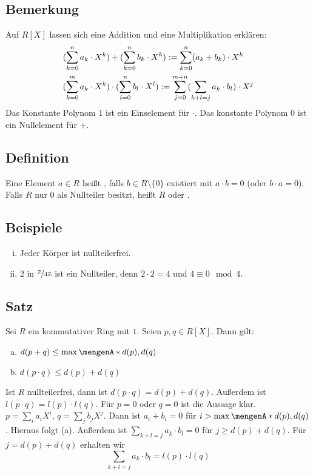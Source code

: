 \subsection[Bemerkung: Addition und Multiplikation auf {$R[X]$}]{Bemerkung} %
\label{sub:54}
Auf $R[X]$ lassen sich eine Addition und eine Multiplikation erklären:
\begin{align*}
	&\enbrace{\sum_{k=0}^{n} a_k \cdot X^k} + \enbrace{\sum_{k=0}^{n} b_k \cdot X^k} := \sum_{k=0}^{n} (a_k + b_k) \cdot X^k  \\
	& \enbrace{\sum_{k=0}^{m} a_k \cdot X^k} \cdot \enbrace{\sum_{l=0}^{n} b_l \cdot X^l} :=  \sum_{j=0}^{m+n} \enbrace{\sum_{k+l=j} a_k \cdot b_l } \cdot X^j 
\end{align*}
Das Konstante Polynom $1$ ist ein Einselement für $\cdot $. Das konstante Polynom $0$ ist ein Nullelement für $+$.

\subsection[Definition: Nullteiler, Integritätsring]{Definition} %
\label{sub:55}
Eine Element $a \in R$ heißt , falls $b \in R\setminus \{0\}$ existiert mit $a \cdot b = 0$ (oder $b \cdot a=0$). Falls $R$ nur $0$ als Nullteiler besitzt,
heißt $R$  oder .   

\subsection[Beispiele zu Nullteilern]{Beispiele} %
\label{sub:56}
\begin{enumerate}[(i)]
	\item Jeder Körper ist nullteilerfrei.
	\item $2$ in $\nicefrac{\mathds{Z}}{4 \mathds{Z}}$ ist ein Nullteiler, denn $2 \cdot 2 =4$ und $4 \equiv 0 \mod 4$.
\end{enumerate}

\subsection[Satz: Abschätzungen für den Grad eines Polynoms]{Satz} %
\label{sub:57}
Sei $R$ ein kommutativer Ring mit $1$. Seien $p,q \in R[X]$. Dann gilt:
\begin{enumerate}[(a)]
	\item $d(p+q) \le \max \set{d(p), d(q)} $
	\item $d(p \cdot q) \le d(p)+ d(q)$
\end{enumerate}
Ist $R$ nullteilerfrei, dann ist $d(p \cdot q) = d(p)+ d(q)$. Außerdem ist $l(p \cdot q)= l(p) \cdot l(q)$.
Für $p=0$ oder $q=0$ ist die Aussage klar. \\ $p = \sum_i a_i X^i $, $q = \sum_j b_j X^j$. Dann ist $a_i + b_i = 0$ für $i > \max \set{d(p), d(q)} $. Hieraus folgt (a).
Außerdem ist $\sum_{k+l=j} a_k \cdot b_l= 0$ für $j\ge d(p)+ d(q)$. Für $j= d(p)+ d(q)$ erhalten wir
\[
	\sum_{k+l=j} a_k \cdot b_l = l(p) \cdot l(q)
\]

